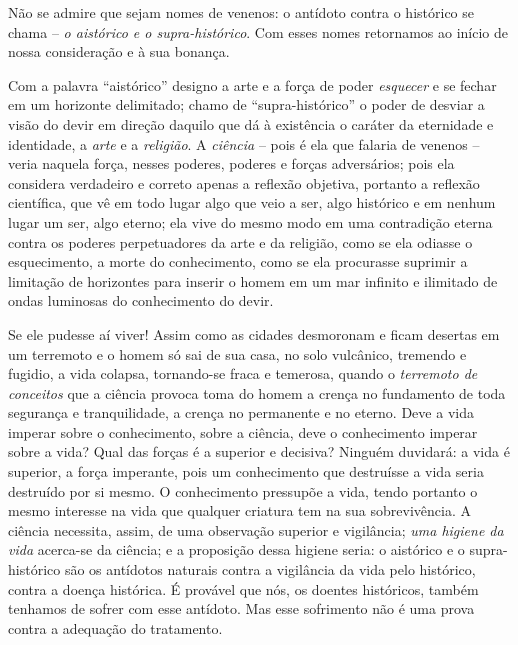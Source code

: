 \begin{enumerate}
\begin{enumerate}
    Não se admire que sejam nomes de venenos: o antídoto contra o
    histórico se chama -- \emph{o aistórico e o supra-histórico}. Com
    esses nomes retornamos ao início de nossa consideração e à sua
    bonança.

    Com a palavra ``aistórico'' designo a arte e a força de poder
    \emph{esquecer} e se fechar em um horizonte delimitado; chamo de
    ``supra-histórico'' o poder de desviar a visão do devir em direção
    daquilo que dá à existência o caráter da eternidade e identidade, a
    \emph{arte} e a \emph{religião}. A \emph{ciência} -- pois é ela que
    falaria de venenos -- veria naquela força, nesses poderes, poderes e
    forças adversários; pois ela considera verdadeiro e correto apenas a
    reflexão objetiva, portanto a reflexão científica, que vê em todo
    lugar algo que veio a ser, algo histórico e em nenhum lugar um ser,
    algo eterno; ela vive do mesmo modo em uma contradição eterna contra
    os poderes perpetuadores da arte e da religião, como se ela odiasse
    o esquecimento, a morte do conhecimento, como se ela procurasse
    suprimir a limitação de horizontes para inserir o homem em um mar
    infinito e ilimitado de ondas luminosas do conhecimento do devir.

    Se ele pudesse aí viver! Assim como as cidades desmoronam e ficam
    desertas em um terremoto e o homem só sai de sua casa, no solo
    vulcânico, tremendo e fugidio, a vida colapsa, tornando-se fraca e
    temerosa, quando o \emph{terremoto de conceitos} que a ciência
    provoca toma do homem a crença no fundamento de toda segurança e
    tranquilidade, a crença no permanente e no eterno. Deve a vida
    imperar sobre o conhecimento, sobre a ciência, deve o conhecimento
    imperar sobre a vida? Qual das forças é a superior e decisiva?
    Ninguém duvidará: a vida é superior, a força imperante, pois um
    conhecimento que destruísse a vida seria destruído por si mesmo. O
    conhecimento pressupõe a vida, tendo portanto o mesmo interesse na
    vida que qualquer criatura tem na sua sobrevivência. A ciência
    necessita, assim, de uma observação superior e vigilância; \emph{uma
    higiene da vida} acerca-se da ciência; e a proposição dessa higiene
    seria: o aistórico e o supra-histórico são os antídotos naturais
    contra a vigilância da vida pelo histórico, contra a doença
    histórica. É provável que nós, os doentes históricos, também
    tenhamos de sofrer com esse antídoto. Mas esse sofrimento não é uma
    prova contra a adequação do tratamento.


\end{enumerate}
\end{enumerate}
